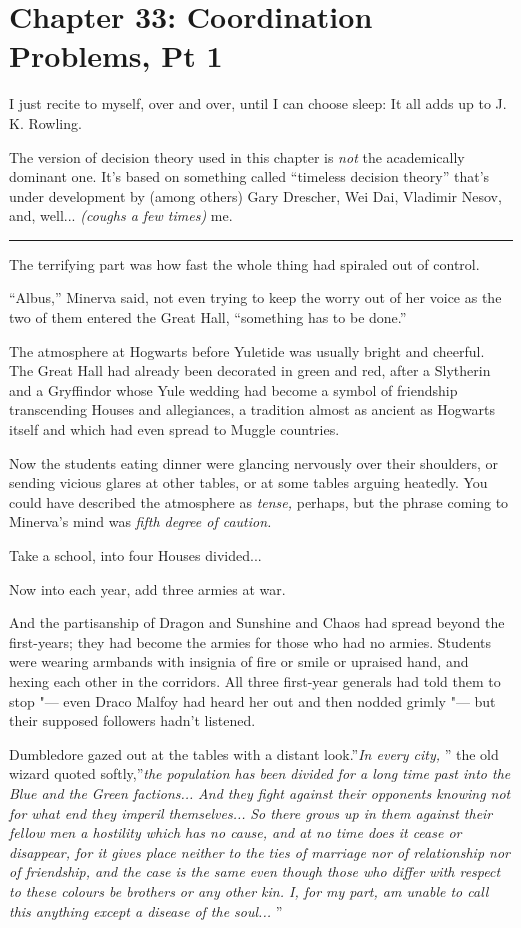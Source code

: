 \chapter{Chapter 33: Coordination Problems, Pt 1}
I just recite to myself, over and over, until I can choose sleep: It all
adds up to J. K. Rowling.

The version of decision theory used in this chapter is \emph{not} the
academically dominant one. It's based on something called ``timeless
decision theory'' that's under development by (among others) Gary
Drescher, Wei Dai, Vladimir Nesov, and, well... \emph{(coughs a few
times)} me.

\begin{center}\rule{3in}{0.4pt}\end{center}

The terrifying part was how fast the whole thing had spiraled out of
control.

``Albus,'' Minerva said, not even trying to keep the worry out of her
voice as the two of them entered the Great Hall, ``something has to be
done.''

The atmosphere at Hogwarts before Yuletide was usually bright and
cheerful. The Great Hall had already been decorated in green and red,
after a Slytherin and a Gryffindor whose Yule wedding had become a
symbol of friendship transcending Houses and allegiances, a tradition
almost as ancient as Hogwarts itself and which had even spread to Muggle
countries.

Now the students eating dinner were glancing nervously over their
shoulders, or sending vicious glares at other tables, or at some tables
arguing heatedly. You could have described the atmosphere as
\emph{tense,} perhaps, but the phrase coming to Minerva's mind was
\emph{fifth degree of caution.}

Take a school, into four Houses divided...

Now into each year, add three armies at war.

And the partisanship of Dragon and Sunshine and Chaos had spread beyond
the first-years; they had become the armies for those who had no armies.
Students were wearing armbands with insignia of fire or smile or
upraised hand, and hexing each other in the corridors. All three
first-year generals had told them to stop "--- even Draco Malfoy had heard
her out and then nodded grimly "--- but their supposed followers hadn't
listened.

Dumbledore gazed out at the tables with a distant look.''\emph{In every
city,} '' the old wizard quoted softly,''\emph{the population has been
divided for a long time past into the Blue and the Green
factions...} \emph{And they fight against their opponents knowing
not for what end they imperil themselves...} \emph{So there grows
up in them against their fellow men a hostility which has no cause, and
at no time does it cease or disappear, for it gives place neither to the
ties of marriage nor of relationship nor of friendship, and the case is
the same even though those who differ with respect to these colours be
brothers or any other kin. I, for my part, am unable to call this
anything except a disease of the soul...} ''


